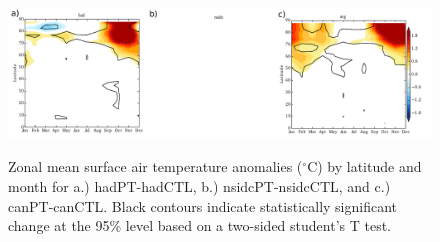 \documentclass[twocol]{ametsoc}
\begin{document}
\begin{figure}[t]
  \noindent\includegraphics[width=39pc,angle=0]{SATwithlat.pdf}\\
  \caption{Zonal mean surface air temperature anomalies ($^\circ$C) by latitude and month for a.) hadPT-hadCTL, b.) nsidcPT-nsidcCTL, and c.) canPT-canCTL. Black contours indicate statistically significant change at the 95\% level based on a two-sided student's T test.
}\label{f1b}
\end{figure}


%

\end{document}
